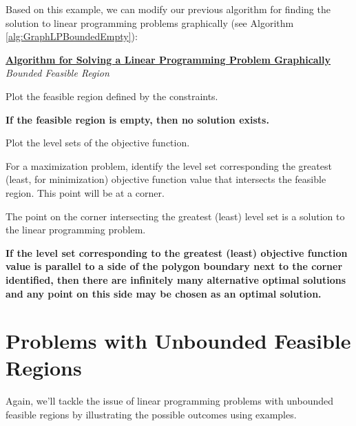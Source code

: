 Based on this example, we can modify our previous algorithm for finding the solution to linear programming problems graphically (see Algorithm \ref{alg:GraphLPBoundedEmpty}):
\begin{algorithm}
\caption{Algorithm for Solving a Two Variable Linear Programming Problem Graphically--Bounded Feasible Region Case}
\label{alg:GraphLPBoundedEmpty}
\begin{center}
\begin{minipage}[t]{\textwidth-1em}
\underline{\textbf{Algorithm for Solving a Linear Programming Problem Graphically}}\\
\textit{Bounded Feasible Region}
\begin{enumerate*}
\item Plot the feasible region defined by the constraints.
\item \textbf{If the feasible region is empty, then no solution exists.}
\item Plot the level sets of the objective function.
\item For a maximization problem, identify the level set corresponding the greatest (least, for minimization) objective function value that intersects the feasible region. This point will be at a corner. 
\item The point on the corner intersecting the greatest (least) level set is a solution to the linear programming problem. 
\item \textbf{If the level set corresponding to the greatest (least) objective function value is parallel to a side of the polygon boundary next to the corner identified, then there are infinitely many alternative optimal solutions and any point on this side may be chosen as an optimal solution.} 
\end{enumerate*}
\end{minipage}
\end{center}
\end{algorithm}

\section{Problems with Unbounded Feasible Regions}
Again, we'll tackle the issue of linear programming problems with unbounded feasible regions by illustrating the possible outcomes using examples.

